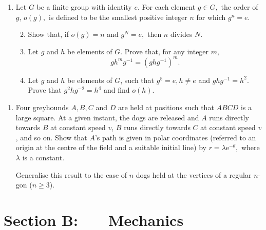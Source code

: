 \documentclass[a4, 11pt]{report}
\newlength{\qspace}
\newcounter{qnumber}
\newenvironment{question}%
 {\vspace{\qspace}
  \begin{enumerate}[\bfseries 1\quad][10]%
    \setcounter{enumi}{\value{qnumber}}%
    \item%
 }
{
  \end{enumerate}
  \filbreak
  \stepcounter{qnumber}
 }
\newenvironment{questionparts}[1][1]%
 {
  \begin{enumerate}[\bfseries (i)]%
    \setcounter{enumii}{#1}
    \addtocounter{enumii}{-1}
    \setlength{\itemsep}{5mm}
    \setlength{\parskip}{8pt}
 }
 {
  \end{enumerate}
 }
\begin{document}
		
		\begin{question}
Let $G$ be a finite group with identity $e.$ For each element $g\in G,$
the order of $g$, $o(g),$ is defined to be the smallest positive
integer $n$ for which $g^{n}=e.$
\begin{questionparts}
\item Show that, if $o(g)=n$ and $g^{N}=e,$ then $n$ divides $N.$
\item Let $g$ and $h$ be elements of $G$. Prove that, for any integer
$m,$ 
\[
gh^{m}g^{-1}=(ghg^{-1})^{m}.
\]

\item Let $g$ and $h$ be elements of $G$, such that $g^{5}=e,h\neq e$
and $ghg^{-1}=h^{2}.$ Prove that $g^{2}hg^{-2}=h^{4}$ and find $o(h).$ 
\end{questionparts}

		\end{question}
		
	
\begin{question}
Four greyhounds $A,B,C$ and $D$ are held at positions such that
$ABCD$ is a large square. At a given instant, the dogs are released
and $A$ runs directly towards $B$ at constant speed $v$, $B$ runs
directly towards $C$ at constant speed $v$, and so on. Show that
$A$'s path is given in polar coordinates (referred to an origin at
the centre of the field and a suitable initial line) by $r=\lambda\mathrm{e}^{-\theta},$
where $\lambda$ is a constant. 


Generalise this result to the case of $n$ dogs held at the vertices
of a regular $n$-gon ($n\geqslant3$). 
			\end{question}
			
		
		
		
	
\newpage
\section*{Section B: \ \ \ Mechanics}
\end{document}
